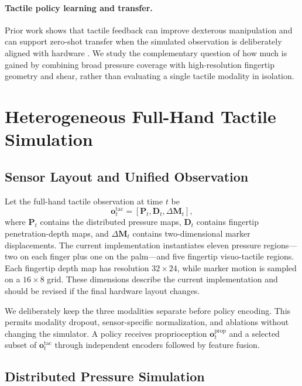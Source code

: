 \documentclass[10pt,twocolumn]{article}
\begin{document}
\paragraph{Tactile policy learning and transfer.}
Prior work shows that tactile feedback can improve dexterous manipulation and
can support zero-shot transfer when the simulated observation is deliberately
aligned with hardware \cite{yin2024tactileskin,akinola2024tacsl,su2026tacmap}.
We study the complementary question of how much is gained by combining broad
pressure coverage with high-resolution fingertip geometry and shear, rather
than evaluating a single tactile modality in isolation.

\section{Heterogeneous Full-Hand Tactile Simulation}
\label{sec:method}

\subsection{Sensor Layout and Unified Observation}

Let the full-hand tactile observation at time $t$ be
\begin{equation}
    \mathbf{o}^{\mathrm{tac}}_t =
    \left[
      \mathbf{P}_t,
      \mathbf{D}_t,
      \Delta\mathbf{M}_t
    \right],
\end{equation}
where $\mathbf{P}_t$ contains the distributed pressure maps,
$\mathbf{D}_t$ contains fingertip penetration-depth maps, and
$\Delta\mathbf{M}_t$ contains two-dimensional marker displacements.  The
current implementation instantiates eleven pressure regions---two on each
finger plus one on the palm---and five fingertip visuo-tactile regions.  Each
fingertip depth map has resolution $32\times24$, while marker motion is sampled
on a $16\times8$ grid.  These dimensions describe the current implementation
and should be revised if the final hardware layout changes.

We deliberately keep the three modalities separate before policy encoding.
This permits modality dropout, sensor-specific normalization, and ablations
without changing the simulator.  A policy receives proprioception
$\mathbf{o}^{\mathrm{prop}}_t$ and a selected subset of
$\mathbf{o}^{\mathrm{tac}}_t$ through independent encoders followed by feature
fusion.

\subsection{Distributed Pressure Simulation}
\end{document}
